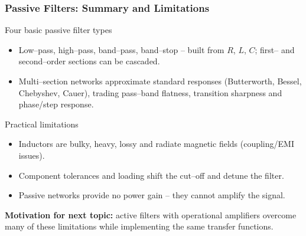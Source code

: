 \begin{frame}
	\frametitle{Passive Filters: Summary and Limitations}
	\small
	\begin{block}{Four basic passive filter types}
		\begin{itemize}
			\item Low--pass, high--pass, band--pass, band--stop -- built from $R$, $L$, $C$; first-- and second--order sections can be cascaded.
			\item Multi--section networks approximate standard responses (Butterworth, Bessel, Chebyshev, Cauer), trading pass--band flatness, transition sharpness and phase/step response.
		\end{itemize}
	\end{block}
	\begin{block}{Practical limitations}
		\begin{itemize}
			\item Inductors are bulky, heavy, lossy and radiate magnetic fields (coupling/EMI issues).
			\item Component tolerances and loading shift the cut--off and detune the filter.
			\item Passive networks provide no power gain -- they cannot amplify the signal.
		\end{itemize}
	\end{block}
	\textbf{Motivation for next topic:} \alert{active filters} with operational amplifiers overcome many of these limitations while implementing the same transfer functions.
\end{frame}

